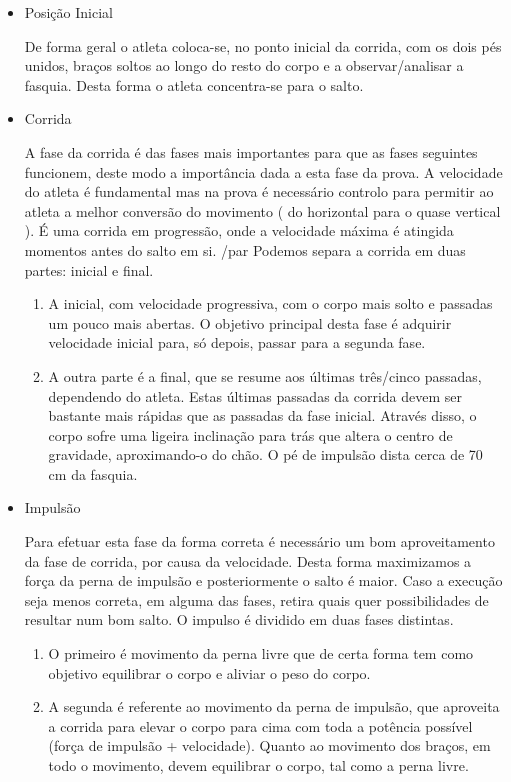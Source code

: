 \documentclass{report}
\begin{document}
            \begin{itemize}
                \item Posição Inicial 
                \par De forma geral o atleta coloca-se, no ponto inicial da corrida, com os dois pés unidos, braços soltos ao longo do resto do corpo e a observar/analisar a fasquia. Desta forma o atleta concentra-se para o salto.
                
                \item Corrida 
                \par A fase da corrida é das fases mais importantes para que as fases seguintes funcionem, deste modo a importância dada a esta fase da prova. A velocidade do atleta é fundamental mas na prova é necessário controlo para permitir ao atleta a melhor conversão do movimento ( do horizontal para o quase vertical ). É uma corrida em progressão, onde a velocidade máxima é atingida momentos antes do salto em si.  /par
                Podemos separa a corrida em duas partes:  inicial e final.
                
                \begin{enumerate}
                    \item A inicial, com velocidade progressiva, com o corpo mais solto e passadas um pouco mais abertas. O objetivo principal desta fase é adquirir velocidade inicial para, só depois, passar para a segunda fase.
                    \item A outra parte é a final, que se resume aos últimas três/cinco passadas, dependendo do atleta. Estas últimas passadas da corrida devem ser bastante mais rápidas que as passadas da fase inicial. Através disso, o corpo sofre uma ligeira inclinação para trás que altera o centro de gravidade, aproximando-o do chão. O pé de impulsão dista cerca de 70 cm da fasquia.
                \end{enumerate}
                
                \item Impulsão 
                \par Para efetuar esta fase da forma correta é necessário um bom aproveitamento da fase de corrida, por causa da velocidade.  Desta forma maximizamos a força da perna de impulsão e posteriormente o salto é maior. Caso a execução seja menos correta, em alguma das fases, retira quais quer possibilidades de resultar num bom salto.
                O impulso é dividido em duas fases distintas.
                \begin{enumerate}
                    \item O primeiro é movimento da perna livre que de certa forma tem como objetivo equilibrar o corpo e aliviar o peso do corpo.
                    \item A segunda é referente ao movimento da perna de impulsão, que aproveita a corrida para elevar o corpo para cima com toda a potência possível (força de impulsão + velocidade). Quanto ao movimento dos braços, em todo o movimento, devem equilibrar o corpo, tal como a perna livre.
                \end{enumerate}
                
            \end{itemize}
\end{document}
